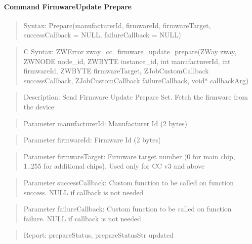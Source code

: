 \paragraph{Command FirmwareUpdate Prepare}
\begin{quote}Syntax: Prepare(manufacturerId, firmwareId, firmwareTarget, successCallback = NULL, failureCallback = NULL)\end{quote}
\begin{quote}C Syntax: ZWError zway\_cc\_firmware\_update\_prepare(ZWay zway, ZWNODE node\_id, ZWBYTE instance\_id, int manufacturerId, int firmwareId, ZWBYTE firmwareTarget, ZJobCustomCallback successCallback, ZJobCustomCallback failureCallback, void* callbackArg)\end{quote}
\begin{quote}Description: Send Firmware Update Prepare Set. Fetch the firmware from the device\end{quote}
\begin{quote}Parameter manufacturerId: Manufacturer Id (2 bytes)\end{quote}
\begin{quote}Parameter firmwareId: Firmware Id (2 bytes)\end{quote}
\begin{quote}Parameter firmwareTarget: Firmware target number (0 for main chip, 1..255 for additional chips). Used only for CC v3 and above\end{quote}
\begin{quote}Parameter successCallback: Custom function to be called on function success. NULL if callback is not needed\end{quote}
\begin{quote}Parameter failureCallback: Custom function to be called on function failure. NULL if callback is not needed\end{quote}
\begin{quote}Report: prepareStatus, prepareStatusStr updated\end{quote}

